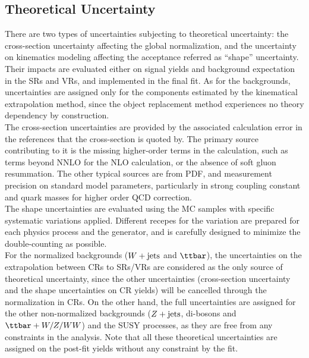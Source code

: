 \subsection{Theoretical Uncertainty} 
There are two types of uncertainties subjecting to theoretical uncertainty: the cross-section uncertainty affecting the global normalization, and the uncertainty on kinematics modeling affecting the acceptance referred as ``shape'' uncertainty.
Their impacts are evaluated either on signal yields and background expectation in the SRs and VRs, and implemented in the final fit. 
As for the backgrounds, uncertainties are assigned only for the components estimated by the kinematical extrapolation method, since the object replacement method experiences no theory dependency by construction. \\

The cross-section uncertainties are provided by the associated calculation error in the references that the cross-section is quoted by. The primary source contributing to it is the missing higher-order terms in the calculation, such as terms beyond NNLO for the NLO calculation, or the absence of soft gluon resummation. The other typical sources are from PDF, and measurement precision on standard model parameters, particularly in strong coupling constant and quark masses for higher order QCD correction.  \\
The shape uncertainties are evaluated using the MC samples with specific systematic variations applied. 
Different recepes for the variation are prepared for each physics process and the generator, and is carefully designed to minimize the double-counting as possible. \\

For the normalized backgrounds ($W+\mathrm{jets}$ and $\ttbar$), the uncertainties on the extrapolation between CRs to SRs/VRs are considered as the only source of theoretical uncertainty, 
since the other uncertainties (cross-section uncertainty and the shape uncertainties on CR yields) will be cancelled through the normalization in CRs. 
On the other hand, the full uncertainties are assigned for the other non-normalized backgrounds ($Z+\mathrm{jets}$, di-bosons and $\ttbar+W/Z/WW$) and the SUSY processes, as they are free from any constraints in the analysis.
Note that all these theoretical uncertainties are assigned on the post-fit yields without any constraint by the fit.


